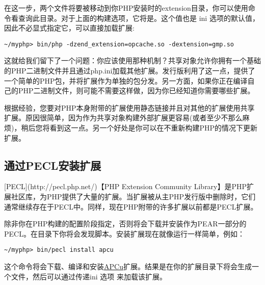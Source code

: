 在这一步，两个文件将要被移动到你PHP安装时的extension目录，你可以使用命令看查询此目录。对于上面的构建选项，它将是。这个值也是 ini 选项的默认值，因此不必显式指定它，可以直接加载扩展:

\begin{lstlisting}[language=shell]
~/myphp> bin/php -dzend_extension=opcache.so -dextension=gmp.so                       
\end{lstlisting}                      

这就给我们留下了一个问题：你应该使用那种机制？共享对象允许你拥有一个基础的PHP二进制文件并且通过php.ini加载其他扩展。发行版利用了这一点，提供了一个简单的PHP包，并将扩展作为单独的包分发。另一方面，如果你正在编译自己的PHP二进制文件，则可能不需要这样做，因为你已经知道你需要哪些扩展。

根据经验，您要对PHP本身附带的扩展使用静态链接并且对其他的扩展使用共享扩展。原因很简单，因为作为共享对象构建外部扩展更容易(或者至少不那么麻烦)，稍后您将看到这一点。另一个好处是你可以在不重新构建PHP的情况下更新扩展。


\subsection{通过PECL安装扩展}

[PECL](http://pecl.php.net/)【PHP Extension Community Library】是PHP扩展社区库，为PHP提供了大量的扩展。当扩展被从主PHP发行版中删除时，它们通常继续存在于PECL中。同样，现在PHP附带的许多扩展以前都是PECL扩展。

除非你在PHP构建的配置阶段指定，否则将会下载并安装作为PEAR一部分的PECL。在目录下你将会发现脚本。安装扩展现在就像运行一样简单，例如：

\begin{lstlisting}[language=shell]
~/myphp> bin/pecl install apcu
\end{lstlisting}

这个命令将会下载、编译和安装\href{http://pecl.php.net/package/APCu}{APCu}扩展。结果是在你的扩展目录下将会生成一个文件，然后可以通过传递ini 选项 来加载该扩展。

